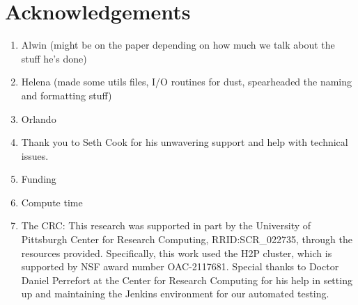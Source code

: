 \section{Acknowledgements}

\begin{enumerate}
    \item Alwin (might be on the paper depending on how much we talk about the stuff he's done)
    \item Helena (made some utils files, I/O routines for dust, spearheaded the naming and formatting stuff)
    \item Orlando
    \item Thank you to Seth Cook for his unwavering support and help with technical issues.
    \item Funding
    \item Compute time
    \item The CRC: This research was supported in part by the University of Pittsburgh Center for Research Computing, RRID:SCR\_022735, through the resources provided. Specifically, this work used the H2P cluster, which is supported by NSF award number OAC-2117681. Special thanks to Doctor Daniel Perrefort at the Center for Research Computing for his help in setting up and maintaining the Jenkins environment for our automated testing.
\end{enumerate}